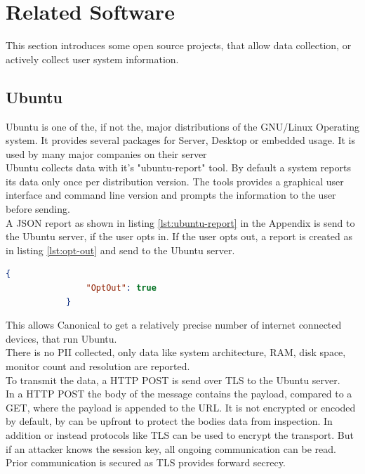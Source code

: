 \section{Related Software}
    \label{sec:related:related_sw}
    This section introduces some open source projects, that allow data collection, or actively collect user system information. 
    
    \subsection{Ubuntu}
        Ubuntu is one of the, if not the, major distributions of the GNU/Linux Operating system. It provides several packages for Server, Desktop or embedded usage. It is used by many major companies on their server\cite{canonical_enterprise_nodate}\\
        Ubuntu collects data with it's "ubuntu-report" tool. By default a system reports its data only once per distribution version. The tools provides a graphical user interface and command line version and prompts the information to the user before sending\cite{roche_ubuntuubuntu-report_2020}.\\
        A JSON report as shown in listing \ref{lst:ubuntu-report} in the Appendix is send to the Ubuntu server, if the user opts in. If the user opts out, a report is created as in listing \ref{lst:opt-out} and send to the Ubuntu server\cite{roche_ubuntuubuntu-report_2020}.\\ 
        \begin{lstlisting}[language=json, caption=JSON report on opt out, label=lst:opt-out]
            {
                "OptOut": true
            }
        \end{lstlisting}
        This allows Canonical to get a relatively precise number of internet connected devices, that run Ubuntu.\\
        There is no PII collected, only data like system architecture, RAM, disk space, monitor count and resolution are reported.\\
        To transmit the data, a HTTP POST is send over TLS to the Ubuntu server.\\
        
        In a HTTP POST the body of the message contains the payload, compared to a GET, where the payload is appended to the URL.
        It is not encrypted or encoded by default, by can be upfront to protect the bodies data from inspection. In addition or instead protocols like TLS can be used to encrypt the transport. But if an attacker knows the session key, all ongoing communication can be read. Prior communication is secured as TLS provides forward secrecy\cite{}.\\
        
